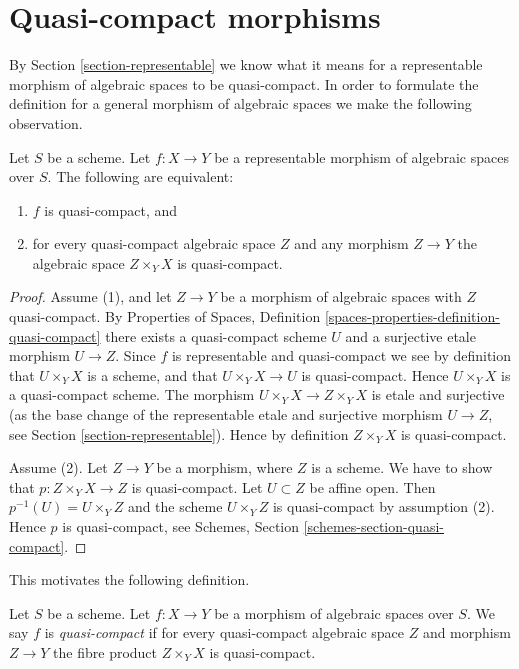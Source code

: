 \section{Quasi-compact morphisms}
\label{section-quasi-compact}

\noindent
By Section \ref{section-representable} we know what it means for
a representable morphism of algebraic spaces to be quasi-compact.
In order to formulate the definition for a general morphism
of algebraic spaces we make the following observation.

\begin{lemma}
\label{lemma-characterize-representable-quasi-compact}
Let $S$ be a scheme.
Let $f : X \to Y$ be a representable morphism of algebraic spaces over $S$.
The following are equivalent:
\begin{enumerate}
\item $f$ is quasi-compact, and
\item for every quasi-compact algebraic space $Z$ and any morphism
$Z \to Y$ the algebraic space $Z \times_Y X$ is quasi-compact.
\end{enumerate}
\end{lemma}

\begin{proof}
Assume (1), and let $Z \to Y$ be a morphism of algebraic spaces with
$Z$ quasi-compact. By
Properties of Spaces,
Definition \ref{spaces-properties-definition-quasi-compact}
there exists a quasi-compact scheme $U$ and a surjective etale
morphism $U \to Z$. Since $f$ is representable and quasi-compact
we see by definition that $U \times_Y X$ is a scheme, and that
$U \times_Y X \to U$ is quasi-compact. Hence $U \times_Y X$ is
a quasi-compact scheme. The morphism $U \times_Y X \to Z \times_Y X$
is etale and surjective (as the base change of the representable
etale and surjective morphism $U \to Z$, see
Section \ref{section-representable}).
Hence by definition $Z \times_Y X$ is quasi-compact.

\medskip\noindent
Assume (2). Let $Z \to Y$ be a morphism, where $Z$ is a scheme.
We have to show that $p : Z \times_Y X \to Z$ is quasi-compact.
Let $U \subset Z$ be affine open. Then $p^{-1}(U) = U \times_Y Z$
and the scheme $U \times_Y Z$ is quasi-compact by assumption (2).
Hence $p$ is quasi-compact, see
Schemes, Section \ref{schemes-section-quasi-compact}.
\end{proof}

\noindent
This motivates the following definition.

\begin{definition}
\label{definition-quasi-compact}
Let $S$ be a scheme.
Let $f : X \to Y$ be a morphism of algebraic spaces over $S$.
We say $f$ is {\it quasi-compact} if for every quasi-compact
algebraic space $Z$ and morphism $Z \to Y$ the fibre product
$Z \times_Y X$ is quasi-compact.
\end{definition}

